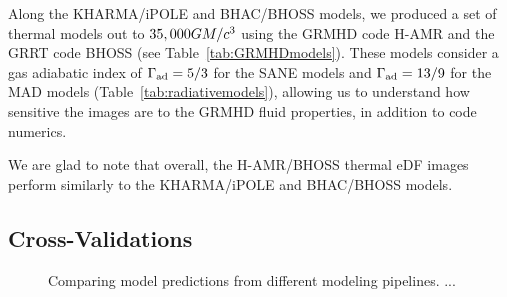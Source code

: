 Along the KHARMA/iPOLE and BHAC/BHOSS models, we produced a set of thermal models out to $35,000GM/c^3$ using the GRMHD code H-AMR and the GRRT code BHOSS (see Table~\ref{tab:GRMHDmodels}). These models consider a gas adiabatic index of $\Gamma_{\rm ad}=5/3$ for the SANE models and $\Gamma_{\rm ad}=13/9$ for the MAD models (Table~\ref{tab:radiativemodels}), allowing us to understand how sensitive the images are to the GRMHD fluid properties, in addition to code numerics. 

We are glad to note that overall, the H-AMR/BHOSS thermal eDF images perform similarly to the KHARMA/iPOLE and BHAC/BHOSS models. 




\subsection{Cross-Validations}


\begin{figure}
    \centering
    \caption{Comparing model predictions from different modeling pipelines.  ...}
    \label{fig:xv}
\end{figure}
